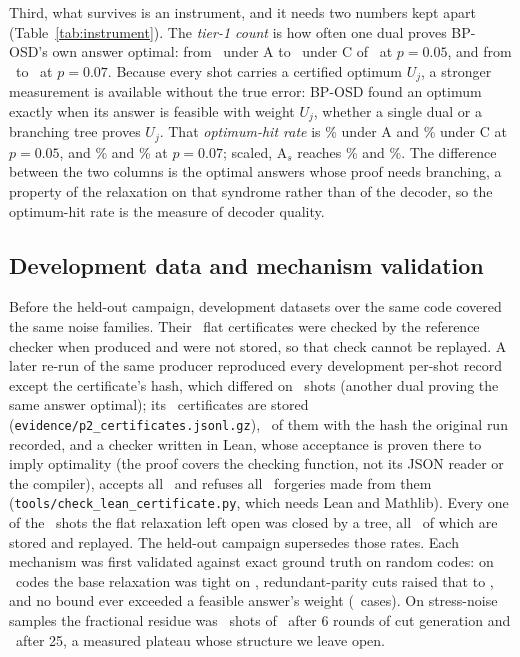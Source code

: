 \documentclass[aps,pra,twocolumn,superscriptaddress,nofootinbib,longbibliography,floatfix]{revtex4-2}
\begin{document}
Third, what survives is an instrument, and it needs two numbers kept apart (Table~\ref{tab:instrument}). The \emph{tier-1 count} is how often one dual proves BP-OSD's own answer optimal: from \RtFiveTierOneA\ under A to \RtFiveTierOneC\ under C of \StrongShots\ at $p=0.05$, and from \RtSevenTierOneA\ to \RtSevenTierOneC\ at $p=0.07$. Because every shot carries a certified optimum $U_j$, a stronger measurement is available without the true error: BP-OSD found an optimum exactly when its answer is feasible with weight $U_j$, whether a single dual or a branching tree proves $U_j$. That \emph{optimum-hit rate} is \StrongFiveOptHitStated\% under A and \StrongFiveOptHitStrongest\% under C at $p=0.05$, and \StrongSevenOptHitStated\% and \StrongSevenOptHitStrongest\% at $p=0.07$; scaled, A$_s$ reaches \StrongFiveOptHitScaledA\% and \StrongSevenOptHitScaledA\%. The difference between the two columns is the optimal answers whose proof needs branching, a property of the relaxation on that syndrome rather than of the decoder, so the optimum-hit rate is the measure of decoder quality.

\subsection{Development data and mechanism validation}

Before the held-out campaign, development datasets over the same code covered the same noise families. Their \DevExactFlat\ flat certificates were checked by the reference checker when produced and were not stored, so that check cannot be replayed. A later re-run of the same producer reproduced every development per-shot record except the certificate's hash, which differed on \DevExportDrift\ shots (another dual proving the same answer optimal); its \DevExportCerts\ certificates are stored (\nolinkurl{evidence/p2_certificates.jsonl.gz}), \DevExportSameHash\ of them with the hash the original run recorded, and a checker written in Lean, whose acceptance is proven there to imply optimality (the proof covers the checking function, not its JSON reader or the compiler), accepts all \DevLeanAccepted\ and refuses all \DevLeanForgeries\ forgeries made from them (\texttt{tools/check\_lean\_certificate.py}, which needs Lean and Mathlib). Every one of the \DevResidues\ shots the flat relaxation left open was closed by a tree, all \ReplayDevTrees\ of which are stored and replayed. The held-out campaign supersedes those rates. Each mechanism was first validated against exact ground truth on random codes: on \EnsLadderCodes\ codes the base relaxation was tight on \EnsBaseTight, redundant-parity cuts raised that to \EnsCutsTight, and no bound ever exceeded a feasible answer's weight (\EnsImpossible\ cases). On stress-noise samples the fractional residue was \RpcResidueSix\ shots of \RpcShots\ after 6 rounds of cut generation and \RpcResidueTwentyFive\ after 25, a measured plateau whose structure we leave open.
\end{document}
